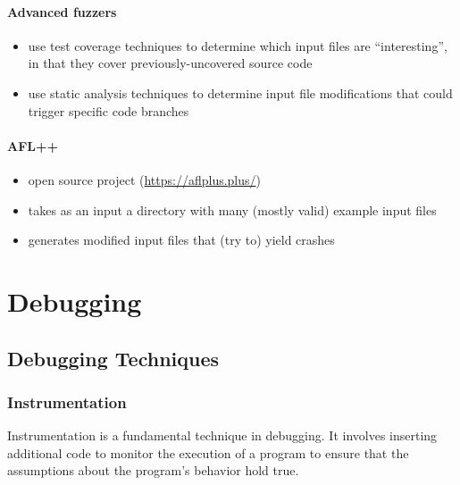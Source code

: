 \documentclass[12pt]{article}
\begin{document}
\paragraph{Advanced fuzzers}

\begin{itemize}
    \item use test coverage techniques 
    to determine which input files are ``interesting'',
    in that they cover previously-uncovered source code
    \item use static analysis techniques 
    to determine input file modifications that could trigger specific code branches
\end{itemize}

\paragraph{AFL++}
\begin{itemize}
    \item open source project (\url{https://aflplus.plus/})
    \item takes as an input a directory with many (mostly valid) example input files
    \item generates modified input files that (try to) yield crashes
\end{itemize}






















\newpage
\section{Debugging}
\subsection{Debugging Techniques}

\subsubsection{Instrumentation}
Instrumentation is a fundamental technique in debugging. It involves inserting additional code to monitor the execution of a program to ensure that the assumptions about the program's behavior hold true.\\
\end{document}
